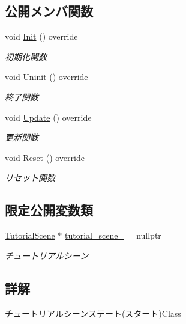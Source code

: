 \subsection*{公開メンバ関数}
\begin{DoxyCompactItemize}
\item 
void \mbox{\hyperlink{class_tutorial_scene_state___start_acd4cd7e4efeebffa9616d7ca31c7b1c0}{Init}} () override
\begin{DoxyCompactList}\small\item\em 初期化関数 \end{DoxyCompactList}\item 
void \mbox{\hyperlink{class_tutorial_scene_state___start_a974962addfb0bcba90fbab64ac6d50f0}{Uninit}} () override
\begin{DoxyCompactList}\small\item\em 終了関数 \end{DoxyCompactList}\item 
void \mbox{\hyperlink{class_tutorial_scene_state___start_a93c322692bf56172f383d3e5b17cd85c}{Update}} () override
\begin{DoxyCompactList}\small\item\em 更新関数 \end{DoxyCompactList}\item 
void \mbox{\hyperlink{class_tutorial_scene_state___start_a40bfdf7acd93b619138bf708adff31e4}{Reset}} () override
\begin{DoxyCompactList}\small\item\em リセット関数 \end{DoxyCompactList}\end{DoxyCompactItemize}
\subsection*{限定公開変数類}
\begin{DoxyCompactItemize}
\item 
\mbox{\hyperlink{class_tutorial_scene}{Tutorial\+Scene}} $\ast$ \mbox{\hyperlink{class_tutorial_scene_state___start_a1fea5f4f4713a1461a86cbc9fc263e41}{tutorial\+\_\+scene\+\_\+}} = nullptr
\begin{DoxyCompactList}\small\item\em チュートリアルシーン \end{DoxyCompactList}\end{DoxyCompactItemize}


\subsection{詳解}
チュートリアルシーンステート(スタート)Class 

